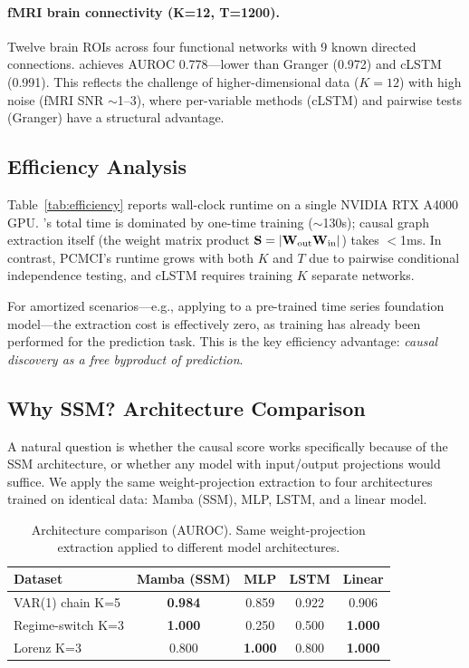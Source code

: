 \paragraph{fMRI brain connectivity (K=12, T=1200).}
Twelve brain ROIs across four functional networks with 9 known
directed connections. \methodname{} achieves AUROC 0.778---lower
than Granger (0.972) and cLSTM (0.991). This reflects the challenge
of higher-dimensional data ($K = 12$) with high noise (fMRI SNR
$\sim$1--3), where per-variable methods (cLSTM) and pairwise tests
(Granger) have a structural advantage.



\subsection{Efficiency Analysis}
\label{sec:efficiency}

Table~\ref{tab:efficiency} reports wall-clock runtime on a single
NVIDIA RTX A4000 GPU. \methodname{}'s total time is dominated by
one-time training ($\sim$130s); causal graph extraction itself
(the weight matrix product $\mathbf{S} = |\mathbf{W}_{\text{out}} \mathbf{W}_{\text{in}}|$)
takes $<$1ms. In contrast, PCMCI's runtime grows with both $K$ and
$T$ due to pairwise conditional independence testing, and cLSTM
requires training $K$ separate networks.

For amortized scenarios---e.g., applying \methodname{} to a
pre-trained time series foundation model---the extraction cost is
effectively zero, as training has already been performed for the
prediction task. This is the key efficiency advantage: \emph{causal
discovery as a free byproduct of prediction}.



\subsection{Why SSM? Architecture Comparison}
\label{sec:architecture}

A natural question is whether the causal score works specifically
because of the SSM architecture, or whether any model with
input/output projections would suffice. We apply the same
weight-projection extraction to four architectures trained on
identical data: Mamba (SSM), MLP, LSTM, and a linear model.

\begin{table}[t]
\centering
\caption{Architecture comparison (AUROC). Same weight-projection
extraction applied to different model architectures.}
\label{tab:architecture}
\begin{tabular}{lcccc}
\toprule
Dataset & Mamba (SSM) & MLP & LSTM & Linear \\
\midrule
VAR(1) chain K=5    & \textbf{0.984} & 0.859 & 0.922 & 0.906 \\
Regime-switch K=3   & \textbf{1.000} & 0.250 & 0.500 & \textbf{1.000} \\
Lorenz K=3          & 0.800 & \textbf{1.000} & 0.800 & \textbf{1.000} \\
\bottomrule
\end{tabular}
\end{table}

